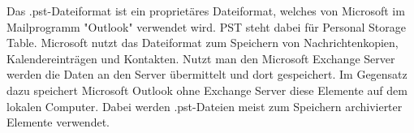 Das .pst-Dateiformat ist ein proprietäres Dateiformat, welches von Microsoft im Mailprogramm "Outlook" verwendet wird. PST steht dabei für Personal Storage Table. Microsoft nutzt das Dateiformat zum Speichern von Nachrichtenkopien, Kalendereinträgen und Kontakten. Nutzt man den Microsoft Exchange Server werden die Daten an den Server übermittelt und dort gespeichert. Im Gegensatz dazu speichert Microsoft Outlook ohne Exchange Server diese Elemente auf dem lokalen Computer. Dabei werden .pst-Dateien meist zum Speichern archivierter Elemente verwendet.